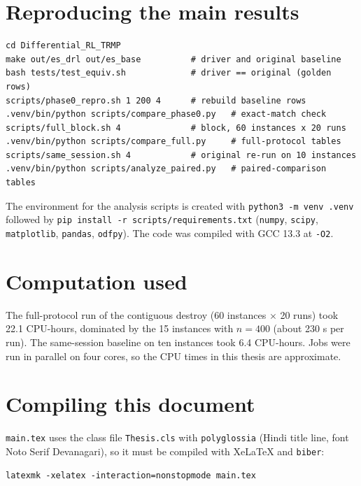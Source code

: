 \section{Reproducing the main results}

\begin{verbatim}
cd Differential_RL_TRMP
make out/es_drl out/es_base          # driver and original baseline
bash tests/test_equiv.sh             # driver == original (golden rows)
scripts/phase0_repro.sh 1 200 4      # rebuild baseline rows
.venv/bin/python scripts/compare_phase0.py   # exact-match check
scripts/full_block.sh 4              # block, 60 instances x 20 runs
.venv/bin/python scripts/compare_full.py     # full-protocol tables
scripts/same_session.sh 4            # original re-run on 10 instances
.venv/bin/python scripts/analyze_paired.py   # paired-comparison tables
\end{verbatim}

The environment for the analysis scripts is created with \texttt{python3 -m venv .venv} followed by \texttt{pip install -r scripts/requirements.txt} (\texttt{numpy}, \texttt{scipy}, \texttt{matplotlib}, \texttt{pandas}, \texttt{odfpy}). The code was compiled with GCC 13.3 at \texttt{-O2}.

\section{Computation used}

The full-protocol run of the contiguous destroy (60 instances $\times$ 20 runs) took 22.1 CPU-hours, dominated by the 15 instances with $n=400$ (about 230 s per run). The same-session baseline on ten instances took 6.4 CPU-hours. Jobs were run in parallel on four cores, so the CPU times in this thesis are approximate.

\section{Compiling this document}

\texttt{main.tex} uses the class file \texttt{Thesis.cls} with \texttt{polyglossia} (Hindi title line, font Noto Serif Devanagari), so it must be compiled with XeLaTeX and \texttt{biber}:
\begin{verbatim}
latexmk -xelatex -interaction=nonstopmode main.tex
\end{verbatim}
